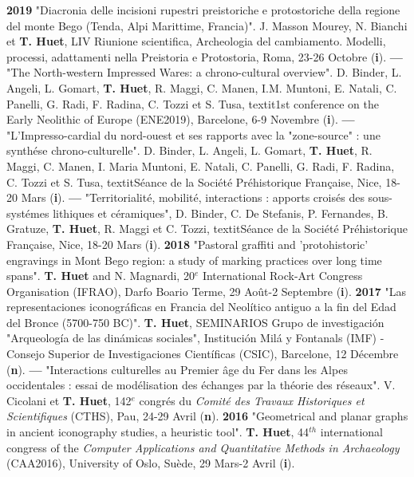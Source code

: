 \documentclass{article}
\begin{document}
\smallbreak
\textbf{2019 }"Diacronia delle incisioni rupestri preistoriche e protostoriche della regione del monte Bego (Tenda, Alpi Marittime, Francia)". J. Masson Mourey, N. Bianchi et \textbf{T. Huet}, LIV Riunione scientifica, Archeologia del cambiamento. Modelli, processi, adattamenti nella Preistoria e Protostoria, Roma, 23-26 Octobre (\textbf{i}).
\smallbreak
\textbf{--- }"The North-western Impressed Wares: a chrono-cultural overview". D. Binder, L. Angeli, L. Gomart, \textbf{T. Huet}, R. Maggi, C. Manen, I.M. Muntoni, E. Natali, C. Panelli, G. Radi, F. Radina, C. Tozzi et S. Tusa, textit{1st conference on the Early Neolithic of Europe (ENE2019)}, Barcelone, 6-9 Novembre (\textbf{i}).
\smallbreak
\textbf{--- }"L'Impresso-cardial du nord-ouest et ses rapports avec la "zone-source" : une synth\'{e}se chrono-culturelle". D. Binder, L. Angeli, L. Gomart, \textbf{T. Huet}, R. Maggi, C. Manen, I. Maria Muntoni, E. Natali, C. Panelli, G. Radi, F. Radina, C. Tozzi et S. Tusa, textit{S\'{e}ance de la Soci\'{e}t\'{e} Pr\'{e}historique Fran\c{c}aise}, Nice, 18-20 Mars (\textbf{i}).
\smallbreak
\textbf{--- }"Territorialit\'{e}, mobilit\'{e}, interactions : apports crois\'{e}s des sous-syst\'{e}mes lithiques et c\'{e}ramiques", D. Binder, C. De Stefanis, P. Fernandes, B. Gratuze, \textbf{T. Huet}, R. Maggi et C. Tozzi, textit{S\'{e}ance de la Soci\'{e}t\'{e} Pr\'{e}historique Fran\c{c}aise}, Nice, 18-20 Mars (\textbf{i}).
\smallbreak
\textbf{2018 }"Pastoral graffiti and 'protohistoric' engravings in Mont Bego region: a study of marking practices over long time spans". \textbf{T. Huet} and N. Magnardi, 20${}^{e}$ International Rock-Art Congress Organisation (IFRAO), Darfo Boario Terme, 29 Août-2 Septembre (\textbf{i}).
\smallbreak
\textbf{2017 }"Las representaciones iconogr\'{a}ficas en Francia del Neol\'{i}tico antiguo a la fin del Edad del Bronce (5700-750 BC)". \textbf{T. Huet}, SEMINARIOS Grupo de investigaci\'{o}n "Arqueolog\'{i}a de las din\'{a}micas sociales", Instituci\'{o}n Mil\'{a} y Fontanals (IMF) - Consejo Superior de Investigaciones Cient\'{i}ficas (CSIC), Barcelone, 12 D\'{e}cembre (\textbf{n}).
\smallbreak
\textbf{--- } "Interactions culturelles au Premier \^{a}ge du Fer dans les Alpes occidentales : essai de mod\'{e}lisation des \'{e}changes par la th\'{e}orie des r\'{e}seaux". V. Cicolani et \textbf{T. Huet}, 142${}^{e}$ congr\'{e}s du \textit{Comit\'{e} des Travaux Historiques et Scientifiques} (CTHS), Pau, 24-29 Avril (\textbf{n}).
\smallbreak
\textbf{2016 }"Geometrical and planar graphs in ancient iconography studies, a heuristic tool". \textbf{T. Huet}, 44${}^{th}$ international congress of the \textit{Computer Applications and Quantitative Methods in Archaeology} (CAA2016), University of Oslo, Suède, 29 Mars-2 Avril (\textbf{i}).
\end{document}
